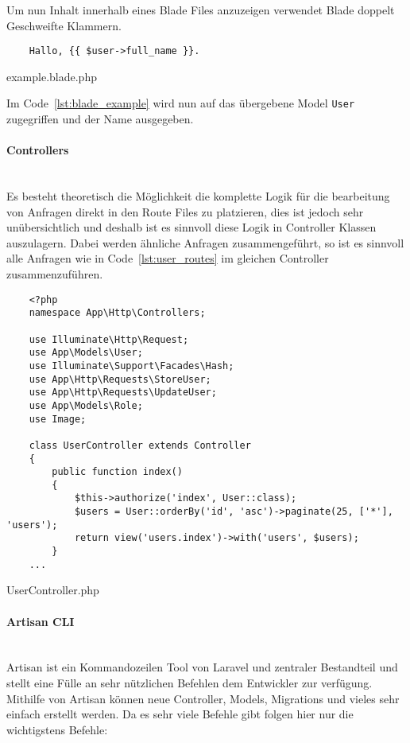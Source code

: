 Um nun Inhalt innerhalb eines Blade Files anzuzeigen verwendet Blade doppelt
Geschweifte Klammern.

\begin{listing}[H]
  \begin{verbatim}
    Hallo, {{ $user->full_name }}.
  \end{verbatim}
  \caption{example.blade.php}
  \label{lst:blade_example}
\end{listing}

Im Code~\ref{lst:blade_example} wird nun auf das übergebene Model \verb|User|
zugegriffen und der Name ausgegeben.

\paragraph{Controllers}\mbox{}\\
Es besteht theoretisch die Möglichkeit die komplette Logik für die bearbeitung
von Anfragen direkt in den Route Files zu platzieren, dies ist jedoch sehr
unübersichtlich und deshalb ist es sinnvoll diese Logik in Controller Klassen
auszulagern. Dabei werden ähnliche Anfragen zusammengeführt, so ist es sinnvoll
alle Anfragen wie in Code~\ref{lst:user_routes} im gleichen Controller
zusammenzuführen.

\begin{listing}[H]
  \begin{verbatim}
    <?php
    namespace App\Http\Controllers;

    use Illuminate\Http\Request;
    use App\Models\User;
    use Illuminate\Support\Facades\Hash;
    use App\Http\Requests\StoreUser;
    use App\Http\Requests\UpdateUser;
    use App\Models\Role;
    use Image;

    class UserController extends Controller
    {
        public function index()
        {
            $this->authorize('index', User::class);
            $users = User::orderBy('id', 'asc')->paginate(25, ['*'], 'users');
            return view('users.index')->with('users', $users);
        }
    ...
  \end{verbatim}
  \caption{UserController.php}
\end{listing}

\paragraph{Artisan CLI}\mbox{}\\
Artisan ist ein Kommandozeilen Tool von Laravel und zentraler Bestandteil und
stellt eine Fülle an sehr nützlichen Befehlen dem Entwickler zur verfügung.
Mithilfe von Artisan können neue Controller, Models, Migrations und vieles sehr
einfach erstellt werden. Da es sehr viele Befehle gibt folgen hier nur die
wichtigstens Befehle:

